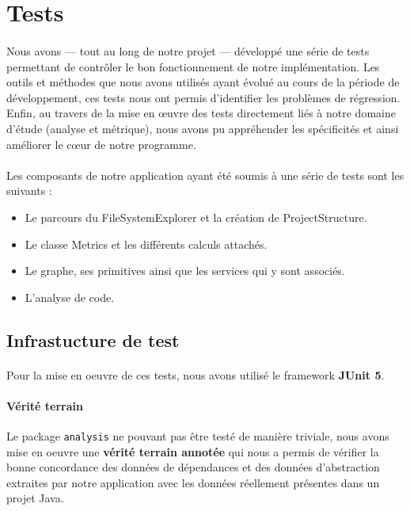 \documentclass{scrartcl}
\begin{document}
        
        
\newpage
\section{Tests}
    \paragraph{}Nous avons — tout au long de notre projet — développé une série de tests permettant de contrôler le bon fonctionnement de notre implémentation. Les outils et méthodes que nous avons utilisés ayant évolué au cours de la période de développement, ces tests nous ont permis d'identifier les problèmes de régression. Enfin, au travers de la mise en œuvre des tests directement liés à notre domaine d’étude (analyse et métrique), nous avons pu appréhender les spécificités et ainsi améliorer le cœur de notre programme.
    
    \paragraph{}Les composants de notre application ayant été soumis à une série de tests sont les suivants : 
    \begin{itemize}
    	\item Le parcours du FileSystemExplorer et la création de ProjectStructure.
    	\item Le classe Metrics et les différents calculs attachés.
    	\item Le graphe, ses primitives ainsi que les services qui y sont associés.
    	\item L’analyse de code.
    \end{itemize}

\subsection{Infrastucture de test}

    \paragraph{}Pour la mise en oeuvre de ces tests, nous avons utilisé le framework \textbf{JUnit 5}.
    
    \paragraph{Vérité terrain}Le package \texttt{analysis} ne pouvant pas être testé de manière triviale, nous avons mise en oeuvre une \textbf{vérité terrain annotée} qui nous a permis de vérifier la bonne concordance des données de dépendances et des données d’abstraction extraites par notre application avec les données réellement présentes dans un projet Java.
    
\end{document}

